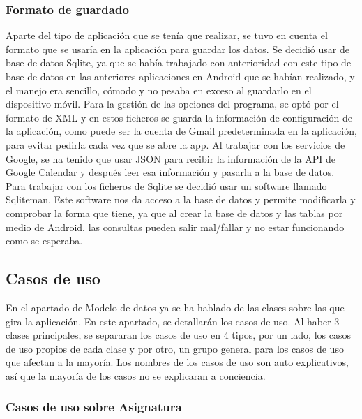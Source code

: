 \subsubsection{Formato de guardado}
\label{subsubsecc:formato de guardado}

Aparte del tipo de aplicación que se tenía que realizar, se tuvo en cuenta el formato que se usaría en la aplicación para guardar los datos.
Se decidió usar de base de datos Sqlite, ya que se había trabajado con anterioridad con este tipo de base de datos en las anteriores aplicaciones en Android que se habían realizado, y el manejo era sencillo, cómodo y no pesaba en exceso al guardarlo en el dispositivo móvil.
Para la gestión de las opciones del programa, se optó por el formato de XML y en estos ficheros se guarda la información de configuración de la aplicación, como puede ser la cuenta de Gmail predeterminada en la aplicación, para evitar pedirla cada vez que se abre la app.
Al trabajar con los servicios de Google, se ha tenido que usar JSON para recibir la información de la API de Google Calendar y después leer esa información y pasarla a la base de datos.
Para trabajar con los ficheros de Sqlite se decidió usar un software llamado Sqliteman.
Este software nos da acceso a la base de datos y permite modificarla y comprobar la forma que tiene, ya que al crear la base de datos y las tablas por medio de Android, las consultas pueden salir mal/fallar y no estar funcionando como se esperaba.

\subsection{Casos de uso}
\label{subsecc:casos de uso}

En el apartado de Modelo de datos ya se ha hablado de las clases sobre las que gira la aplicación.
En este apartado, se detallarán los casos de uso. Al haber 3 clases principales, se separaran los casos de uso en 4  tipos, por un lado, los casos de uso propios de cada clase y por otro, un grupo general para los casos de uso que afectan a la mayoría.
Los nombres de los casos de uso son auto explicativos, así que la mayoría de los casos no se explicaran a conciencia.

\subsubsection{Casos de uso sobre Asignatura}
\label{subsubsecc:Casos de uso sobre Asignatura}

